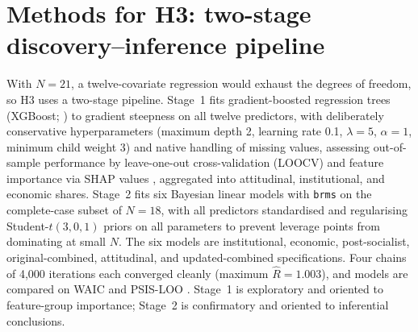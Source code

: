 \documentclass[12pt,a4paper]{report}
\begin{document}
\section{Methods for H3: two-stage discovery--inference pipeline}
With $N=21$, a twelve-covariate regression would exhaust the degrees of freedom, so H3 uses a
two-stage pipeline. Stage~1 fits gradient-boosted regression trees (XGBoost; \citealp{chenguestrin2016})
to gradient steepness on all twelve predictors, with deliberately conservative hyperparameters
(maximum depth 2, learning rate 0.1, $\lambda=5$, $\alpha=1$, minimum child weight 3) and native
handling of missing values, assessing out-of-sample performance by leave-one-out cross-validation
(LOOCV) and feature importance via SHAP values \citep{lundberglee2017}, aggregated into attitudinal,
institutional, and economic shares. Stage~2 fits six Bayesian linear models with \texttt{brms}
\citep{burkner2017} on the complete-case subset of $N=18$, with all predictors standardised and
regularising Student-$t(3,0,1)$ priors on all parameters to prevent leverage points from dominating
at small $N$. The six models are institutional, economic, post-socialist, original-combined,
attitudinal, and updated-combined specifications. Four chains of 4,000 iterations each converged
cleanly (maximum $\hat{R}=1.003$), and models are compared on WAIC and PSIS-LOO \citep{vehtari2017}.
Stage~1 is exploratory and oriented to feature-group importance; Stage~2 is confirmatory and oriented
to inferential conclusions.
\end{document}
